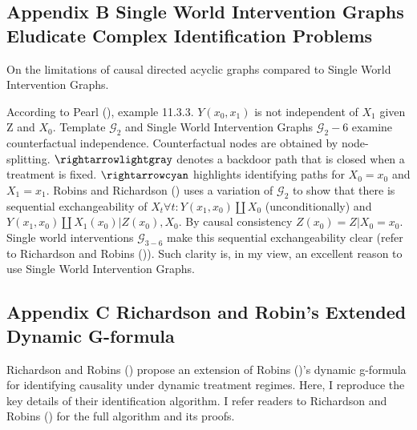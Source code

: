 \documentclass[
  single column]{article}
\begin{document}
\newpage{}

\subsection{Appendix B Single World Intervention Graphs Eludicate
Complex Identification Problems}\label{id-app-b}

\begin{table}

\caption{\label{tbl-pearltable}On the limitations of causal directed
acyclic graphs compared to Single World Intervention Graphs.}

\centering{

\pearltable

}

\end{table}%

According to Pearl (), example 11.3.3.
\(Y(x_0, x_1)\) is not independent of \(X_1\) given Z and \(X_0\).
Template \(\mathcal{G}_2\) and Single World Intervention Graphs
\(\mathcal{G}_2-6\) examine counterfactual independence. Counterfactual
nodes are obtained by node-splitting. \(\rightarrowlightgray\) denotes a
backdoor path that is closed when a treatment is fixed.
\(\rightarrowcyan\) highlights identifying paths for \(X_0 = x_0\) and
\(X_1 = x_1\). Robins and Richardson
() uses a variation of
\(\mathcal{G}_2\) to show that there is sequential exchangeability of
\(X_t \forall t: Y(x_1, x_0)\coprod X_0\) (unconditionally) and
\(Y(x_1, x_0)\coprod X_1(x_0) | Z(x_0), X_0\). By causal consistency
\(Z(x_0) = Z|X_0 = x_0\). Single world interventions
\(\mathcal{G}_{3-6}\) make this sequential exchangeability clear (refer
to Richardson and Robins ()). Such
clarity is, in my view, an excellent reason to use Single World
Intervention Graphs.

\newpage{}

\subsection{Appendix C Richardson and Robin's Extended Dynamic
G-formula}\label{id-app-c}

Richardson and Robins () propose an
extension of Robins ()'s dynamic
g-formula for identifying causality under dynamic treatment regimes.
Here, I reproduce the key details of their identification algorithm. I
refer readers to Richardson and Robins
() for the full algorithm and its
proofs.
\end{document}

